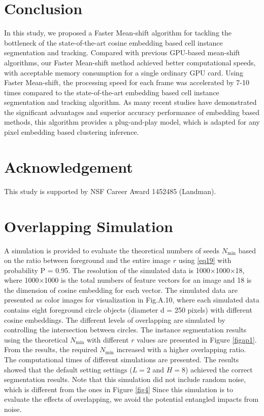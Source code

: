 \documentclass[journal,twoside,web]{ieeecolor}
\begin{document}
\section{Conclusion}
In this study, we proposed a Faster Mean-shift algorithm for tackling the bottleneck of the state-of-the-art cosine embedding based cell instance segmentation and tracking. Compared with previous GPU-based mean-shift algorithms, our Faster Mean-shift method achieved better computational speeds, with acceptable memory consumption for a single ordinary GPU card. Using Faster Mean-shift, the processing speed for each frame was accelerated by 7-10 times compared to the state-of-the-art embedding based cell instance segmentation and tracking algorithm. As many recent studies have demonstrated the significant advantages and superior accuracy performance of embedding based methods, this algorithm provides a plug-and-play model, which is adapted for any pixel embedding based clustering inference. 

\section{Acknowledgement}
This study is supported by 
NSF Career Award 1452485 (Landman).


{}


\onecolumn
\appendix

\section{Overlapping Simulation}
A simulation is provided to evaluate the theoretical numbers of seeds $N_{\min }$ based on the ratio between foreground and the entire image $r$ using \eqref{eq19} with probability P = 0.95. The resolution of the simulated data is 1000×1000×18, where 1000×1000 is the total numbers of feature vectors for an image and 18 is the dimension of cosine embedding for each vector. The simulated data are presented as color images for visualization in Fig.A.10, where each simulated data contains eight foreground circle objects (diameter d = 250 pixels) with different cosine embeddings. The different levels of overlapping are simulated by controlling the intersection between circles. The instance segmentation results using the theoretical $N_{\min }$ with different $r$ values are presented in Figure \ref{figap1}. From the results, the required $N_{\min }$ increased with a higher overlapping ratio. The computational times of different simulations are presented. The results showed that the default setting settings ($L=2$ and $H=8$) achieved the correct segmentation results. Note that this simulation did not include random noise, which is different from the ones in Figure \ref{fig4} Since this simulation is to evaluate the effects of overlapping, we avoid the potential entangled impacts from noise. 
\end{document}

